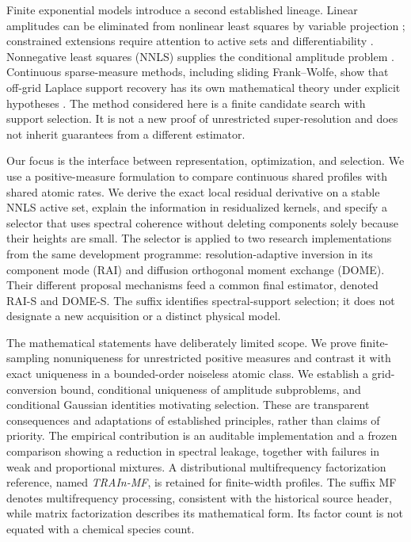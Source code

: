 Finite exponential models introduce a second established lineage. Linear amplitudes can be eliminated from nonlinear least squares by variable projection \cite{golub}; constrained extensions require attention to active sets and differentiability \cite{shearer}. Nonnegative least squares (NNLS) supplies the conditional amplitude problem \cite{lawson}. Continuous sparse-measure methods, including sliding Frank--Wolfe, show that off-grid Laplace support recovery has its own mathematical theory under explicit hypotheses \cite{denoyelle}. The method considered here is a finite candidate search with support selection. It is not a new proof of unrestricted super-resolution and does not inherit guarantees from a different estimator.

Our focus is the interface between representation, optimization, and selection. We use a positive-measure formulation to compare continuous shared profiles with shared atomic rates. We derive the exact local residual derivative on a stable NNLS active set, explain the information in residualized kernels, and specify a selector that uses spectral coherence without deleting components solely because their heights are small. The selector is applied to two research implementations from the same development programme: resolution-adaptive inversion in its component mode (RAI) and diffusion orthogonal moment exchange (DOME). Their different proposal mechanisms feed a common final estimator, denoted RAI-S and DOME-S. The suffix identifies spectral-support selection; it does not designate a new acquisition or a distinct physical model.

The mathematical statements have deliberately limited scope. We prove finite-sampling nonuniqueness for unrestricted positive measures and contrast it with exact uniqueness in a bounded-order noiseless atomic class. We establish a grid-conversion bound, conditional uniqueness of amplitude subproblems, and conditional Gaussian identities motivating selection. These are transparent consequences and adaptations of established principles, rather than claims of priority. The empirical contribution is an auditable implementation and a frozen comparison showing a reduction in spectral leakage, together with failures in weak and proportional mixtures. A distributional multifrequency factorization reference, named \emph{TRAIn-MF}, is retained for finite-width profiles. The suffix MF denotes multifrequency processing, consistent with the historical source header, while matrix factorization describes its mathematical form. Its factor count is not equated with a chemical species count.


